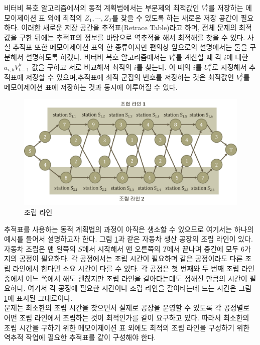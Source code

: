 \documentclass[a4paper]{oblivoir}
\begin{document}
비터비 복호 알고리즘에서의 동적 계획법에서는 부문제의 최적값인 $V_{t}^{k}$를 저장하는 메모이제이션 표 외에 최적의 $Z_1,\cdots,Z_{T}$를 찾을 수 있도록 하는 새로운 저장 공간이 필요하다. 이러한 새로운 저장 공간을 추적표(Retrace Table)라고 하며, 전체 문제의 최적값을 구한  뒤에는 추적표의 정보를 바탕으로 역추적을 해서 최적해를 찾을 수 있다. 사실 추적표 또한 메모이제이션 표의 한 종류이지만 편의상 앞으로의 설명에서는 둘을 구분해서 설명하도록 하겠다. 비터비 복호 알고리즘에서는 $V_{t}^{k}$를 계산할 때 각 $i$에 대한 $a_{i,k} V_{t-1}^{k}$ 값을 구하고 서로 비교해서 최적의 $i$를 찾는다. 이 때의 $i$를 $U_{t}^{k}$로 지정해서 추적표에 저장할 수 있으며,추적표에 최적 군집의 번호를 저장하는 것은 최적값인 $V_{t}^{k}$를 메모이제이션 표에 저장하는 것과 동시에 이루어질 수 있다. \\ 

\begin{figure}[ht] \centering 
\includegraphics[scale=0.45]{fig9_13.png} 
\caption{조립 라인}
\label{fig:9-14}
\end{figure}

추적표를 사용하는 동적 계획법의 과정이 아직은 생소할 수 있으므로 여기서는 하나의 예시를 들어서 설명하고자 한다. 그림 \ref{fig:9-14}과 같은 자동차 생산 공장의 조립 라인이 있다. 자동차 조립은 맨 왼쪽의 $S$에서 시작해서 맨 오른쪽의 $T$에서 끝나며 중간에 모두 6가지의 공정이 필요하다. 각 공정에서는 조립 시간이 필요하며 같은 공정이라도 다른 조립 라인에서 한다면 소요 시간이 다를 수 있다. 각 공정은 첫 번째와 두 번째 조립 라인 중에서 어느 쪽에서 해도 괜찮지만 조립 라인을 갈아타는데도 정해진 만큼의 시간이 필요하다. 여기서 각 공정에 필요한 시간이나 조립 라인을 갈아타는데 드는 시간은 그림 \ref{fig:9-14}에 표시된 그대로이다.\\

문제는 최소한의 조립 시간을 찾으면서 실제로 공장을 운영할 수 있도록 각 공정별로 어떤 조립 라인에서 조립하는 것이 최적인가를 같이 요구하고 있다. 따라서 최소한의 조립 시간을 구하기 위한 메모이제이션 표 외에도 최적의 조립 라인을 구성하기 위한 역추적 작업에 필요한 추적표를 같이 구성해야 한다. \\
\end{document}
